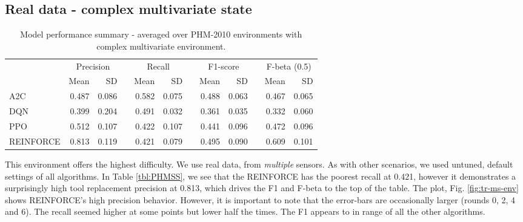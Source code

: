 \documentclass[a4paper, 12pt]{article}
\newcommand{\rowspace}[1]{\renewcommand{\arraystretch}{#1}}
\begin{document}
\subsection{Real data - complex multivariate state}
\begin{table}[!htb]\centering
	\sffamily
	\rowspace{1.3}
	\begin{tabular}{@{}l rr c rr c rr c rr@{}}
		\arrayrulecolor{black!40}\toprule
		& \multicolumn{2}{c}{Precision} & \phantom{i} & \multicolumn{2}{c}{Recall} & \phantom{i} & \multicolumn{2}{c}{F1-score} & \phantom{i} & \multicolumn{2}{c}{F-beta (0.5)} \\
		\cmidrule{2-3} \cmidrule{5-6} \cmidrule{8-9} \cmidrule{11-12} 
		
		&Mean &SD & &Mean &SD & &Mean &SD& &Mean & SD\\ \midrule
		A2C & 0.487 & 0.086 & &0.582 & 0.075 & & 0.488 & 0.063 & &0.467 &0.065 \\
		DQN & 0.399 & 0.204 & &0.491 & 0.032 & & 0.361 & 0.035 & &0.332 &0.060 \\
		PPO & 0.512 & 0.107 & &0.422 & 0.107 & & 0.441 & 0.096 & &0.472 &0.096 \\
		REINFORCE & 0.813 & 0.119 & &0.421 & 0.079 & & 0.495 & 0.090 & &0.609 &0.101 \\
		\bottomrule
	\end{tabular}
	\caption{Model performance summary - averaged over PHM-2010 environments with complex multivariate environment.}
	\label{tbl:PHMMS}
\end{table}
This environment offers the highest difficulty. We use real data, from \textit{multiple} sensors. As with other scenarios, we used untuned, default settings of all algorithms. In Table \ref{tbl:PHMSS}, we see that the REINFORCE has the poorest recall at 0.421, however it demonstrates a surprisingly high tool replacement precision at 0.813, which drives the F1 and F-beta to the top of the table. The plot, Fig. \ref{fig:tr-ms-env} shows REINFORCE's high precision behavior. However, it is important to note that the error-bars are occasionally larger (rounds 0, 2, 4 and 6). The recall seemed higher at some points but lower half the times. The F1 appears to in range of all the other algorithms.
\end{document}
